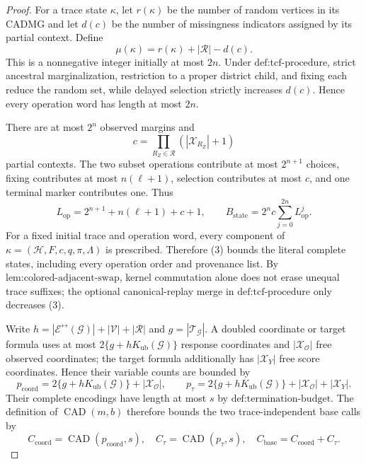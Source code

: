 \documentclass{article}
\begin{document}
\begin{proof}
For a trace state \(\kappa\), let \(r(\kappa)\) be the number of random vertices in its CADMG and let \(d(c)\) be the number of missingness indicators assigned by its partial context. Define
\[
\mu(\kappa)=r(\kappa)+|\mathcal R|-d(c).
\tag{1}
\]
This is a nonnegative integer initially at most \(2n\). Under \(\text{def:tcf-procedure}\), strict ancestral marginalization, restriction to a proper district child, and fixing each reduce the random set, while delayed selection strictly increases \(d(c)\). Hence every operation word has length at most \(2n\).

There are at most \(2^n\) observed margins and
\[
c=\prod_{R_Z\in\mathcal R}(|\mathcal X_{R_Z}|+1)
\tag{2}
\]
partial contexts. The two subset operations contribute at most \(2^{n+1}\) choices, fixing contributes at most \(n(\ell+1)\), selection contributes at most \(c\), and one terminal marker contributes one. Thus
\[
L_{\mathrm{op}}=2^{n+1}+n(\ell+1)+c+1,
\qquad
B_{\mathrm{state}}=2^n c\sum_{j=0}^{2n}L_{\mathrm{op}}^j.
\tag{3}
\]
For a fixed initial trace and operation word, every component of \(\kappa=(\mathcal H,F,c,q,\pi,\Lambda)\) is prescribed. Therefore (3) bounds the literal complete states, including every operation order and provenance list. By \(\text{lem:colored-adjacent-swap}\), kernel commutation alone does not erase unequal trace suffixes; the optional canonical-replay merge in \(\text{def:tcf-procedure}\) only decreases (3).

Write \(h=|\mathcal E^{\leftrightarrow}(\mathcal G)|+|\mathcal V|+|\mathcal R|\) and \(g=|\mathcal T_{\mathcal G}|\). A doubled coordinate or target formula uses at most \(2\{g+hK_{\mathrm{ub}}(\mathcal G)\}\) response coordinates and \(|\mathcal X_{\mathcal O}|\) free observed coordinates; the target formula additionally has \(|\mathcal X_Y|\) free score coordinates. Hence their variable counts are bounded by
\[
p_{\mathrm{coord}}=2\{g+hK_{\mathrm{ub}}(\mathcal G)\}+|\mathcal X_{\mathcal O}|,
\qquad
p_{\tau}=2\{g+hK_{\mathrm{ub}}(\mathcal G)\}+|\mathcal X_{\mathcal O}|+|\mathcal X_Y|.
\tag{4}
\]
Their complete encodings have length at most \(s\) by \(\text{def:termination-budget}\). The definition of \(\operatorname{CAD}(m,b)\) therefore bounds the two trace-independent base calls by
\[
C_{\mathrm{coord}}=\operatorname{CAD}(p_{\mathrm{coord}},s),
\quad
C_{\tau}=\operatorname{CAD}(p_{\tau},s),
\quad
C_{\mathrm{base}}=C_{\mathrm{coord}}+C_{\tau}.
\tag{5}
\]


\end{proof}
\end{document}
